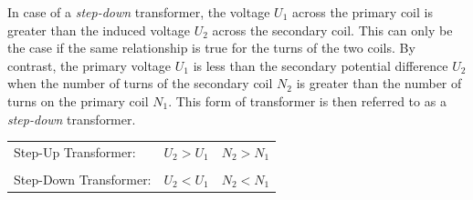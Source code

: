 
In case of a \emph{step-down} transformer, the voltage $U_1$ across the primary coil is greater than the induced voltage $U_2$ across the secondary coil. This can only be the case if the same relationship is true for the turns of the two coils. By contrast, the primary voltage $U_1$ is less than the secondary potential difference $U_2$ when the number of turns of the secondary coil $N_2$ is greater than the number of turns on the primary coil $N_1$. This form of transformer is then referred to as a \emph{step-down} transformer. 

\begin{table}[h!]
	\centering
	\begin{tabular}{l l l}
		
		Step-Up Transformer: & $U_2 > U_1$ & $N_2 > N_1$
		\\ && \\
		Step-Down Transformer: & $U_2 < U_1$ & $N_2 < N_1$

	\end{tabular}
\end{table}

